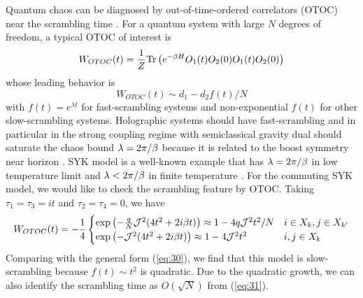 \documentclass[11pt]{article}
\renewcommand{\>}{\rangle}
\newcommand{\<}{\langle}
\begin{document}
Quantum chaos can be diagnosed by out-of-time-ordered correlators
(OTOC) near the scrambling time \cite{Shenker:2013pqa, kitaev2014hidden, Roberts:2014ifa}. For a quantum system with large $N$ degrees of freedom, a typical OTOC of interest
is 
\begin{equation}
W_{OTOC}(t)=\frac{1}{Z}\text{Tr}\left(e^{-\beta H}O_{1}(t)O_{2}(0)O_{1}(t)O_{2}(0)\right)\label{eq:29}
\end{equation}
whose leading behavior is
\begin{equation}
W_{OTOC}(t)\sim d_{1}-d_{2}f(t)/N\label{eq:30}
\end{equation}
with $f(t)=e^{\lambda t}$ for fast-scrambling systems \cite{Shenker:2013pqa, kitaev2014hidden, Roberts:2014ifa,Shenker:2013yza,Shenker:2014cwa,Maldacena:2016hyu} and
non-exponential $f(t)$ for other slow-scrambling systems.
Holographic systems should have fast-scrambling and in particular
in the strong coupling regime with semiclassical gravity dual should saturate
the chaos bound $\lambda=2\pi/\beta$ \cite{Maldacena:2015waa} because it is related
to the boost symmetry near horizon \cite{Shenker:2013pqa}. SYK model is a well-known
example that has $\lambda=2\pi/\beta$ in low temperature limit and $\lambda<2\pi/\beta$
in finite temperature \cite{Maldacena:2016hyu}. For the commuting SYK model, we would
like to check the scrambling feature by OTOC. Taking $\tau_{1}=\tau_{3}=it$
and $\tau_{2}=\tau_{4}=0$, we have
\begin{equation}
W_{OTOC}(t)=-\frac{1}{4}\begin{cases}
\exp\left(-\frac{q}{N}\mathcal{J}^{2}(4t^{2}+2i\beta t)\right)\approx1-4q\mathcal{J}^{2}t^{2}/N & i\in X_{k},j\in X_{k'}\\
\exp\left(-\mathcal{J}^{2}(4t^{2}+2i\beta t)\right)\approx1-4\mathcal{J}^{2}t^{2} & i,j\in X_{k}
\end{cases}\label{eq:31}
\end{equation}
Comparing with the general form (\ref{eq:30}), we find that this
model is slow-scrambling because $f(t)\sim t^{2}$ is quadratic. Due
to the quadratic growth, we can also identify the scrambling time
as $O(\sqrt{N})$ from (\ref{eq:31}).
\end{document}
